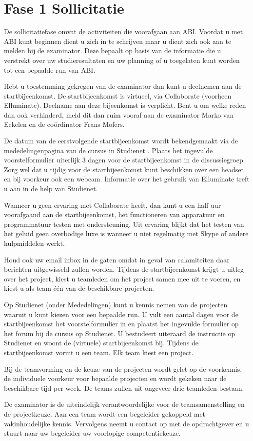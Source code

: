 \section{Fase 1 Sollicitatie}
De sollicitatiefase omvat de activiteiten die voorafgaan aan ABI.
Voordat u met ABI kunt beginnen dient u zich in te schrijven maar
u dient zich ook aan te melden bij de examinator. Deze bepaalt op
basis van de informatie die u verstrekt over uw studieresultaten
en uw planning of u toegelaten kunt worden tot een bepaalde run
van ABI.

Hebt u toestemming gekregen van de examinator dan kunt u
deelnemen aan de startbijeenkomst. De startbijeenkomst is virtueel,
via Collaborate (voorheen Elluminate). Deelname aan deze bijeenkomst
is verplicht. Bent u om welke reden dan ook
verhinderd, meld dit dan ruim vooraf aan de examinator Marko
van Eekelen en de coördinator Frans Mofers.

De datum van de eerstvolgende startbijeenkomst wordt bekendgemaakt
via de mededelingenpagina van de cursus in Studienet . Plaats het
ingevulde voorstelformulier uiterlijk 3 dagen voor de startbijeenkomst
in de discussiegroep. Zorg wel dat u tijdig voor de startbijeenkomst
kunt beschikken over een headset en bij voorkeur ook een webcam.
Informatie over het gebruik van Elluminate treft u aan in de help van Studienet.

Wanneer u geen ervaring met Collaborate heeft, dan kunt u een half uur
voorafgaand aan de startbijeenkomst, het functioneren van apparatuur
en programmatuur testen met ondersteuning. Uit ervaring blijkt dat het
testen van het geluid geen overbodige luxe is wanneer u niet regelmatig
met Skype of andere hulpmiddelen werkt.

Houd ook uw email inbox in de gaten omdat in geval van calamiteiten
daar berichten uitgewisseld zullen worden. Tijdens de startbijeenkomst
krijgt u uitleg over het project, kiest u teamleden om het project samen
mee uit te voeren, en kiest u als team \'e\'en van de beschikbare projecten.

Op Studienet (onder Mededelingen) kunt u kennis nemen van de projecten
waaruit u kunt kiezen voor een bepaalde run. U vult een aantal dagen
voor de startbijeenkomst het voorstelformulier in en plaatst het
ingevulde formulier op het forum bij de cursus op Studienet.
U bestudeert uiteraard de instructie op Studienet en woont de (virtuele)
startbijeenkomst bij. Tijdens de startbijeenkomst vormt u een team.
Elk team kiest een project.

Bij de teamvorming en de keuze van de projecten wordt gelet op de
voorkennis, de individuele voorkeur voor bepaalde projecten en wordt
gekeken naar de beschikbare tijd per week. De teams zullen uit ongeveer
drie teamleden bestaan.

De examinator is de uiteindelijk verantwoordelijke voor de
teamsamenstelling en de projectkeuze. Aan een team wordt een
begeleider gekoppeld met vakinhoudelijke kennis. Vervolgens neemt u
contact op met de opdrachtgever en u stuurt naar uw begeleider
uw voorlopige competentiekeuze.
